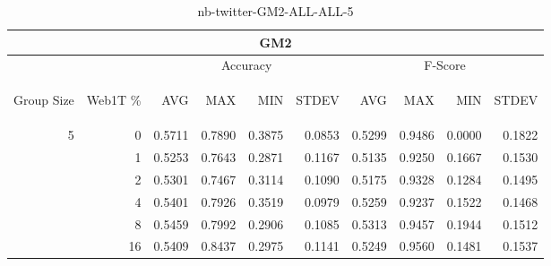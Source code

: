 \begin{center}
\begin{table}[htbp]
\begin{tabular}{ | r | r | r | r | r | r | r | r | r | r |}
\hline
\multicolumn{10}{|c|}{GM2}\\
\hline
 & & \multicolumn{4}{|c|}{Accuracy} & \multicolumn{4}{|c|}{F-Score}\\ \cline{3-10}
\begin{sideways}Group Size\end{sideways} & \begin{sideways}Web1T \%\end{sideways} & \begin{sideways}AVG\end{sideways} & \begin{sideways}MAX\end{sideways} & \begin{sideways}MIN\end{sideways} & \begin{sideways}STDEV\end{sideways} & \begin{sideways}AVG\end{sideways} & \begin{sideways}MAX\end{sideways} & \begin{sideways}MIN\end{sideways} & \begin{sideways}STDEV\end{sideways}\\
\hline
\multirow{5}{*}{5}
 & 0 & 0.5711 & 0.7890 & 0.3875 & 0.0853 & 0.5299 & 0.9486 & 0.0000 & 0.1822\\ \cline{2-10}
 & 1 & 0.5253 & 0.7643 & 0.2871 & 0.1167 & 0.5135 & 0.9250 & 0.1667 & 0.1530\\ \cline{2-10}
 & 2 & 0.5301 & 0.7467 & 0.3114 & 0.1090 & 0.5175 & 0.9328 & 0.1284 & 0.1495\\ \cline{2-10}
 & 4 & 0.5401 & 0.7926 & 0.3519 & 0.0979 & 0.5259 & 0.9237 & 0.1522 & 0.1468\\ \cline{2-10}
 & 8 & 0.5459 & 0.7992 & 0.2906 & 0.1085 & 0.5313 & 0.9457 & 0.1944 & 0.1512\\ \cline{2-10}
 & 16 & 0.5409 & 0.8437 & 0.2975 & 0.1141 & 0.5249 & 0.9560 & 0.1481 & 0.1537\\ \cline{2-10}
\hline
\end{tabular}
\caption{nb-twitter-GM2-ALL-ALL-5}
\label{table:nb-twitter-GM2-ALL-ALL-5}
\end{table}
\end{center}

